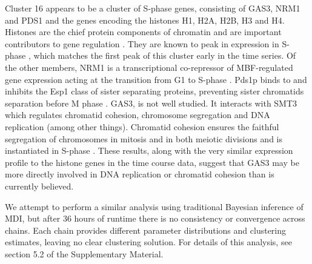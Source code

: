 \documentclass{article}
\begin{document}
Cluster 16 appears to be a cluster of S-phase genes, consisting of GAS3, NRM1 and PDS1 and the genes encoding the histones H1, H2A, H2B, H3 and H4. Histones are the chief protein components of chromatin \citep{fischle2003histone} and are important contributors to gene regulation \citep{bannister2011regulation}. They are known to peak in expression in S-phase \citep{granovskaia2010high}, which matches the first peak of this cluster early in the time series. Of the other members, NRM1 is a transcriptional co-repressor of MBF-regulated gene expression acting at the transition from G1 to S-phase \citep{de2006constraining, aligianni2009fission}. Pds1p binds to and inhibits the Esp1 class of sister separating proteins, preventing sister chromatids separation before M phase \citep{ciosk1998esp1, toth1999yeast}. GAS3, is not well studied. It interacts with SMT3 which regulates chromatid cohesion, chromosome segregation and DNA replication (among other things). Chromatid cohesion ensures the faithful segregation of chromosomes in mitosis and in both meiotic divisions \citep{cooper2009pds1p} and is instantiated in S-phase \citep{toth1999yeast}. These results, along with the very similar expression profile to the histone genes in the time course data, suggest that GAS3 may be more directly involved in DNA replication or chromatid cohesion than is currently believed.

We attempt to perform a similar analysis using traditional Bayesian inference of MDI, but after 36 hours of runtime there is no consistency or convergence across chains. Each chain provides different parameter distributions and clustering estimates, leaving no clear clustering solution. For details of this analysis, see section 5.2 of the Supplementary Material.

\end{document}
